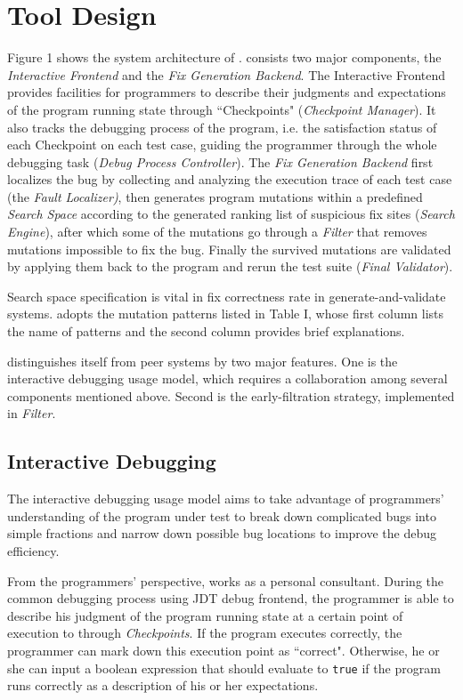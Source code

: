 \section{Tool Design}

Figure 1 shows the system architecture of \SmartDebug. \SmartDebug consists two major components, the \textit{Interactive Frontend} and the \textit{Fix Generation Backend}. The Interactive Frontend provides facilities for programmers to describe their judgments and expectations of the program running state through ``Checkpoints" (\textit{Checkpoint Manager}). It also tracks the debugging process of the program, i.e. the satisfaction status of each Checkpoint on each test case, guiding the programmer through the whole debugging task (\textit{Debug Process Controller}). The \textit{Fix Generation Backend} first localizes the bug by collecting and analyzing the execution trace of each test case (the \textit{Fault Localizer)}, then generates program mutations within a predefined \textit{Search Space} according to the generated ranking list of suspicious fix sites (\textit{Search Engine}), after which some of the mutations go through a \textit{Filter} that removes mutations impossible to fix the bug. Finally the survived mutations are validated by applying them back to the program and rerun the test suite (\textit{Final Validator}).

Search space specification is vital in fix correctness rate in generate-and-validate systems. \SmartDebug adopts the mutation patterns listed in Table I, whose first column lists the name of patterns and the second column provides brief explanations.

\SmartDebug distinguishes itself from peer systems by two major features. One is the interactive debugging usage model, which requires a collaboration among several components mentioned above. Second is the early-filtration strategy, implemented in \textit{Filter}. 

\subsection{Interactive Debugging}

The interactive debugging usage model aims to take advantage of programmers' understanding of the program under test to break down complicated bugs into simple fractions and narrow down possible bug locations to improve the debug efficiency.

From the programmers' perspective, \SmartDebug works as a personal consultant. During the common debugging process using JDT debug frontend, the programmer is able to describe his judgment of the program running state at a certain point of execution to \SmartDebug through \textit{Checkpoints}. If the program executes correctly, the programmer can mark down this execution point as ``correct". Otherwise, he or she can input a boolean expression that should evaluate to \texttt{true} if the program runs correctly as a description of his or her expectations.


